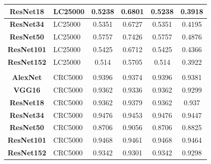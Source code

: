 \begin{table}[t!]
\begin{tabular}{|c|l|c|c|c|c|}
\textbf{ResNet18}      & LC25000                               & 0.5238                & 0.6801                & 0.5238                & 0.3918                \\ \hline
\textbf{ResNet34}      & LC25000                               & 0.5351                & 0.6727                & 0.5351                & 0.4195                \\ \hline
\textbf{ResNet50}      & LC25000                               & 0.5757                & 0.7426                & 0.5757                & 0.4876                \\ \hline
\textbf{ResNet101}     & LC25000                               & 0.5425                & 0.6712                & 0.5425                & 0.4366                \\ \hline
\textbf{ResNet152}     & LC25000                               & 0.514                 & 0.5705                & 0.514                 & 0.3922                \\ \hline
\multicolumn{1}{|l|}{} &                                       & \multicolumn{1}{l|}{} & \multicolumn{1}{l|}{} & \multicolumn{1}{l|}{} & \multicolumn{1}{l|}{} \\ \hline
\textbf{AlexNet}       & CRC5000                               & 0.9396                & 0.9374                & 0.9396                & 0.9381                \\ \hline
\textbf{VGG16}         & CRC5000                               & 0.9362                & 0.9336                & 0.9362                & 0.9299                \\ \hline
\textbf{ResNet18}      & CRC5000                               & 0.9362                & 0.9379                & 0.9362                & 0.937                 \\ \hline
\textbf{ResNet34}      & CRC5000                               & 0.9476                & 0.9453                & 0.9476                & 0.9447                \\ \hline
\textbf{ResNet50}      & CRC5000                               & 0.8706                & 0.9056                & 0.8706                & 0.8825                \\ \hline
\textbf{ResNet101}     & CRC5000                               & 0.9468                & 0.9461                & 0.9468                & 0.9464                \\ \hline
\textbf{ResNet152}     & CRC5000                               & 0.9342                & 0.9301                & 0.9342                & 0.9298                \\ \hline
\end{tabular}
\end{table}



